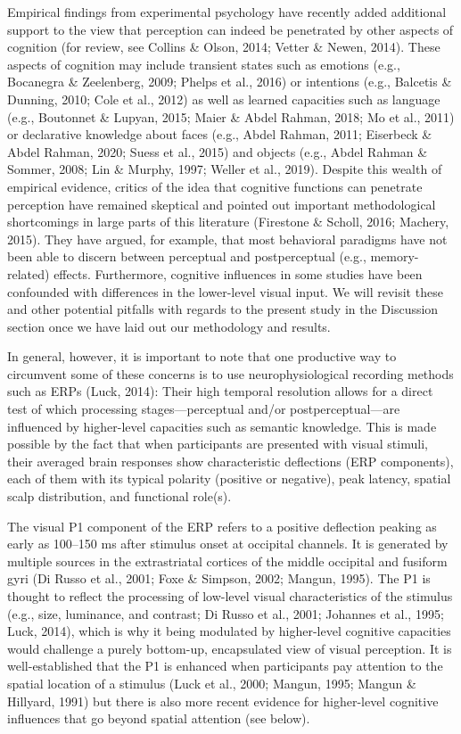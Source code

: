 \documentclass[
  english,
  man,floatsintext]{apa7}
\begin{document}
Empirical findings from experimental psychology have recently added additional support to the view that perception can indeed be penetrated by other aspects of cognition (for review, see Collins \& Olson, 2014; Vetter \& Newen, 2014). These aspects of cognition may include transient states such as emotions (e.g., Bocanegra \& Zeelenberg, 2009; Phelps et al., 2016) or intentions (e.g., Balcetis \& Dunning, 2010; Cole et al., 2012) as well as learned capacities such as language (e.g., Boutonnet \& Lupyan, 2015; Maier \& Abdel Rahman, 2018; Mo et al., 2011) or declarative knowledge about faces (e.g., Abdel Rahman, 2011; Eiserbeck \& Abdel Rahman, 2020; Suess et al., 2015) and objects (e.g., Abdel Rahman \& Sommer, 2008; Lin \& Murphy, 1997; Weller et al., 2019). Despite this wealth of empirical evidence, critics of the idea that cognitive functions can penetrate perception have remained skeptical and pointed out important methodological shortcomings in large parts of this literature (Firestone \& Scholl, 2016; Machery, 2015). They have argued, for example, that most behavioral paradigms have not been able to discern between perceptual and postperceptual (e.g., memory-related) effects. Furthermore, cognitive influences in some studies have been confounded with differences in the lower-level visual input. We will revisit these and other potential pitfalls with regards to the present study in the Discussion section once we have laid out our methodology and results.

In general, however, it is important to note that one productive way to circumvent some of these concerns is to use neurophysiological recording methods such as ERPs (Luck, 2014): Their high temporal resolution allows for a direct test of which processing stages---perceptual and/or postperceptual---are influenced by higher-level capacities such as semantic knowledge. This is made possible by the fact that when participants are presented with visual stimuli, their averaged brain responses show characteristic deflections (ERP components), each of them with its typical polarity (positive or negative), peak latency, spatial scalp distribution, and functional role(s).

The visual P1 component of the ERP refers to a positive deflection peaking as early as 100--150 ms after stimulus onset at occipital channels. It is generated by multiple sources in the extrastriatal cortices of the middle occipital and fusiform gyri (Di Russo et al., 2001; Foxe \& Simpson, 2002; Mangun, 1995). The P1 is thought to reflect the processing of low-level visual characteristics of the stimulus (e.g., size, luminance, and contrast; Di Russo et al., 2001; Johannes et al., 1995; Luck, 2014), which is why it being modulated by higher-level cognitive capacities would challenge a purely bottom-up, encapsulated view of visual perception. It is well-established that the P1 is enhanced when participants pay attention to the spatial location of a stimulus (Luck et al., 2000; Mangun, 1995; Mangun \& Hillyard, 1991) but there is also more recent evidence for higher-level cognitive influences that go beyond spatial attention (see below).
\end{document}
